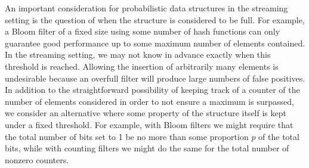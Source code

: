 An important consideration for probabilistic data structures in the streaming setting is the question of when the structure is considered to be full. For example, a Bloom filter of a fixed size using some number of hash functions can only guarantee good performance up to some maximum number of elements contained. In the streaming setting, we may not know in advance exactly when this threshold is reached. Allowing the insertion of arbitrarily many elements is undesirable because an overfull filter will produce large numbers of false positives. In addition to the straightforward possibility of keeping track of a counter of the number of elements considered in order to not ensure a maximum is surpassed, we consider an alternative where some property of the structure itself is kept under a fixed threshold. For example, with Bloom filters we might require that the total number of bits set to 1 be no more than some proportion $p$ of the total bits, while with counting filters we might do the same for the total number of nonzero counters.